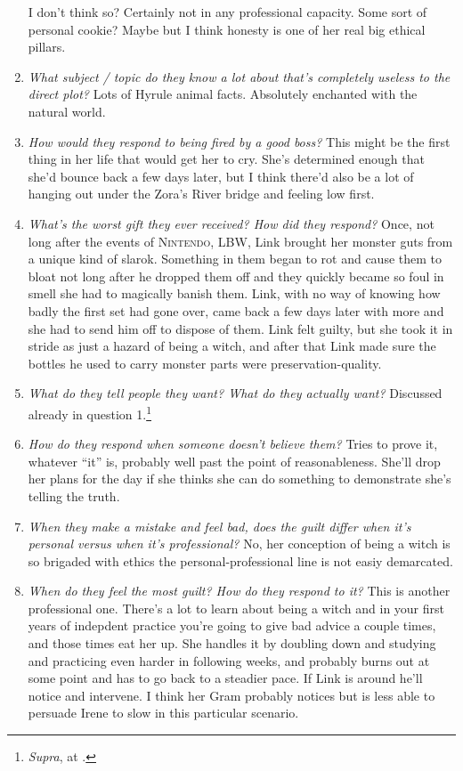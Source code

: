 \begin{enumerate}
      I don't think so? Certainly not in any professional capacity. Some sort of personal cookie? Maybe but I think honesty is one of her real big ethical pillars.
    \item \textit{What subject / topic do they know a lot about that’s completely useless to the direct plot?}
      Lots of Hyrule animal facts. Absolutely enchanted with the natural world. 
    \item \textit{How would they respond to being fired by a good boss?}
      This might be the first thing in her life that would get her to cry. She's determined enough that she'd bounce back a few days later, but I think there'd also be a lot of hanging out under the Zora's River bridge and feeling low first.
    \item \textit{What’s the worst gift they ever received? How did they respond?}
      Once, not long after the events of \textsc{Nintendo, LBW}, Link brought her monster guts from a unique kind of slarok. Something in them began to rot and cause them to bloat not long after he dropped them off and they quickly became so foul in smell she had to magically banish them. Link, with no way of knowing how badly the first set had gone over, came back a few days later with more and she had to send him off to dispose of them. Link felt guilty, but she took it in stride as just a hazard of being a witch, and after that Link made sure the bottles he used to carry monster parts were preservation-quality. 
    \item \textit{What do they tell people they want? What do they actually want?}
      Discussed already in question 1.\footnote{\textit{Supra}, at \pageref{irene:characterqs:lies}.}
    \item \textit{How do they respond when someone doesn’t believe them?}
      Tries to prove it, whatever ``it'' is, probably well past the point of reasonableness. She'll drop her plans for the day if she thinks she can do something to demonstrate she's telling the truth.
    \item \textit{When they make a mistake and feel bad, does the guilt differ when it’s personal versus when it’s professional?}
      No, her conception of being a witch is so brigaded with ethics the personal-professional line is not easiy demarcated.
    \item \textit{When do they feel the most guilt? How do they respond to it?}
      This is another professional one. There's a lot to learn about being a witch and in your first years of indepdent practice you're going to give bad advice a couple times, and those times eat her up. She handles it by doubling down and studying and practicing even harder in following weeks, and probably burns out at some point and has to go back to a steadier pace. If Link is around he'll notice and intervene. I think her Gram probably notices but is less able to persuade Irene to slow in this particular scenario.

\end{enumerate}
